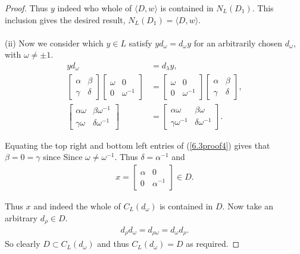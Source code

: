 \begin{proof}
Thus $y$ indeed who whole of $\langle D , w \rangle$ is contained in $N_L(D_1)$. This inclusion gives the desired result, $N_L(D_1) = \langle D , w \rangle$. \\
\\
(ii) Now we consider which $y \in L$ satisfy $y d_\omega = d_\omega y$ for an arbitrarily chosen $d_\omega$, with $\omega \neq \pm 1$.
\begin{align}\label{6.3proof4} y d_ \omega &= d_\lambda y, \nonumber \\[1.5ex]
\begin{bmatrix} \alpha & \beta \\ \gamma & \delta \end{bmatrix} \begin{bmatrix} \omega & 0 \\ 0 & \omega^{-1} \end{bmatrix} &= \begin{bmatrix} \omega & 0 \\ 0 & \omega^{-1} \end{bmatrix} \begin{bmatrix} \alpha & \beta \\ \gamma & \delta \end{bmatrix}, \nonumber \\[1.5ex]
\begin{bmatrix} \alpha \omega & \beta \omega^{-1} \\ \gamma \omega & \delta \omega^{-1} \end{bmatrix} &= \begin{bmatrix} \alpha \omega & \beta \omega \\ \gamma \omega^{-1} & \delta \omega^{-1} \end{bmatrix}.
\end{align}

Equating the top right and bottom left entries of (\ref{6.3proof4}) gives that $\beta = 0 = \gamma$ since Since $\omega \neq \omega^{-1}$. Thus $\delta = \alpha^{-1}$ and 
\begin{align*} x = \begin{bmatrix} \alpha & 0 \\ 0 & \alpha^{-1} \end{bmatrix} \in D. 
\end{align*}

Thus $x$ and indeed the whole of $C_L(d_\omega)$ is contained in $D$. Now take an arbitrary $d_\rho \in D$.
\begin{align*} d_\rho d_\omega = d_{\rho \omega} = d_\omega d_\rho.
\end{align*}
So clearly $D \subset C_L(d_\omega)$ and thus $C_L(d_\omega) = D$ as required.
\end{proof}

